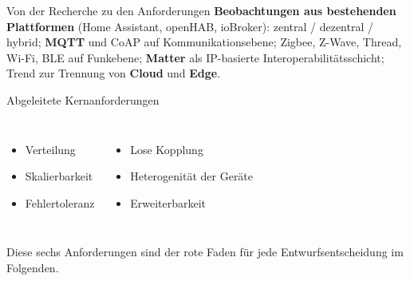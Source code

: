 \documentclass[aspectratio=169,11pt]{beamer}
\begin{document}
\begin{frame}{Von der Recherche zu den Anforderungen}
  \textbf{Beobachtungen aus bestehenden Plattformen} (Home Assistant, openHAB, ioBroker):
  zentral / dezentral / hybrid; \textbf{MQTT} und CoAP auf Kommunikationsebene;
  Zigbee, Z-Wave, Thread, Wi-Fi, BLE auf Funkebene; \textbf{Matter} als IP-basierte
  Interoperabilit\"atsschicht; Trend zur Trennung von \textbf{Cloud} und \textbf{Edge}.

  \vspace{1em}
  \begin{block}{Abgeleitete Kernanforderungen}
    \begin{columns}[T]
        \begin{itemize}
          \item Verteilung
          \item Skalierbarkeit
          \item Fehlertoleranz
        \end{itemize}
        \begin{itemize}
          \item Lose Kopplung
          \item Heterogenit\"at der Ger\"ate
          \item Erweiterbarkeit
        \end{itemize}
    \end{columns}
  \end{block}
  \vspace{0.3em}
  {\small Diese sechs Anforderungen sind der rote Faden f\"ur jede Entwurfsentscheidung im Folgenden.}
\end{frame}
\end{document}
